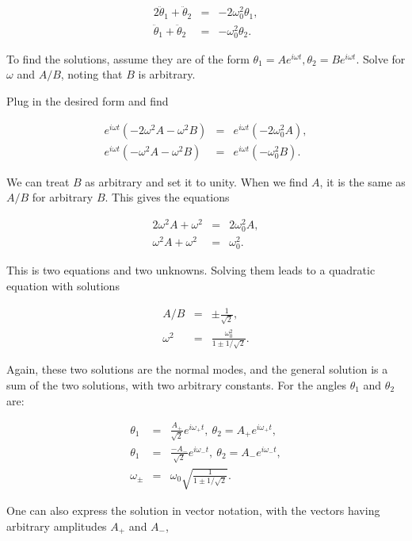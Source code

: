 \documentclass[%
oneside,                 %
final,                   %
10pt]{article}
\begin{document}
\begin{eqnarray}
2\ddot{\theta}_1+\ddot{\theta}_2&=&-2\omega_0^2\theta_1,\\
\nonumber
\ddot{\theta}_1+\ddot{\theta}_2&=&-\omega_0^2\theta_2.
\end{eqnarray}

To find the solutions, assume they are of the form
$\theta_1=Ae^{i\omega t}, \theta_2=Be^{i\omega t}$. Solve for $\omega$
and $A/B$, noting that $B$ is arbitrary.

Plug in the desired form and find

\begin{eqnarray*}
e^{i\omega t}(-2\omega^2A-\omega^2B)&=&e^{i\omega t}(-2\omega_0^2A),\\
e^{i\omega t}(-\omega^2A-\omega^2B)&=&e^{i\omega t}(-\omega_0^2B).
\end{eqnarray*}

We can treat $B$ as arbitrary and set it to unity. When we find $A$,
it is the same as $A/B$ for arbitrary $B$. This gives the equations

\begin{eqnarray*}
2\omega^2A+\omega^2&=&2\omega_0^2A,\\
\omega^2A+\omega^2&=&\omega_0^2.
\end{eqnarray*}

This is two equations and two unknowns. Solving them leads to a
quadratic equation with solutions

\begin{eqnarray*}
A/B&=&\pm\frac{1}{\sqrt{2}},\\
\omega^2&=&\frac{\omega_0^2}{1\pm 1/\sqrt{2}}.
\end{eqnarray*}

Again, these two solutions are the normal modes, and the general
solution is a sum of the two solutions, with two arbitrary
constants. For the angles $\theta_1$ and $\theta_2$ are:

\begin{eqnarray*}
\theta_1&=&\frac{A_+}{\sqrt{2}}e^{i\omega_+t}, ~\theta_2=A_+e^{i\omega_+t},\\
\theta_1&=&\frac{-A_-}{\sqrt{2}}e^{i\omega_-t}, ~\theta_2=A_-e^{i\omega_-t},\\
\omega_{\pm}&=&\omega_0\sqrt{\frac{1}{1\pm 1/\sqrt{2}}}.
\end{eqnarray*}

One can also express the solution in vector notation, with the vectors
having arbitrary amplitudes $A_+$ and $A_-$,
\end{document}
